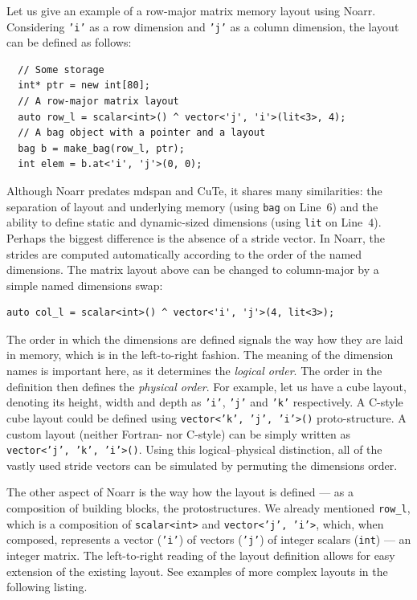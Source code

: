 Let us give an example of a row-major matrix memory layout using Noarr. Considering \texttt{'i'} as a row dimension and \texttt{'j'} as a column dimension, the layout can be defined as follows:

\begin{verbatim}
  // Some storage
  int* ptr = new int[80];
  // A row-major matrix layout
  auto row_l = scalar<int>() ^ vector<'j', 'i'>(lit<3>, 4);
  // A bag object with a pointer and a layout
  bag b = make_bag(row_l, ptr);
  int elem = b.at<'i', 'j'>(0, 0);
\end{verbatim}

Although Noarr predates mdspan and CuTe, it shares many similarities: the separation of layout and underlying memory (using \texttt{bag} on Line~$6$) and the ability to define static and dynamic-sized dimensions (using \texttt{lit} on Line~$4$). Perhaps the biggest difference is the absence of a stride vector. In Noarr, the strides are computed automatically according to the order of the named dimensions. The matrix layout above can be changed to column-major by a simple named dimensions swap:
\begin{verbatim}
auto col_l = scalar<int>() ^ vector<'i', 'j'>(4, lit<3>);
\end{verbatim}
The order in which the dimensions are defined signals the way how they are laid in memory, which is in the left-to-right fashion. The meaning of the dimension names is important here, as it determines the \emph{logical order}. The order in the definition then defines the \emph{physical order}. For example, let us have a cube layout, denoting its height, width and depth as \texttt{'i'}, \texttt{'j'} and \texttt{'k'} respectively. A C-style cube layout could be defined using \texttt{vector<'k', 'j', 'i'>()} proto-structure. A custom layout (neither Fortran- nor C-style) can be simply written as \texttt{vector<'j', 'k', 'i'>()}. Using this logical--physical distinction, all of the vastly used stride vectors can be simulated by permuting the dimensions order.

The other aspect of Noarr is the way how the layout is defined --- as a composition of building blocks, the protostructures. We already mentioned \texttt{row\_l}, which is a composition of \texttt{scalar<int>} and \texttt{vector<'j', 'i'>}, which, when composed, represents a vector (\texttt{'i'}) of vectors (\texttt{'j'}) of integer scalars (\texttt{int}) --- an integer matrix. The left-to-right reading of the layout definition allows for easy extension of the existing layout. See examples of more complex layouts in the following listing.

